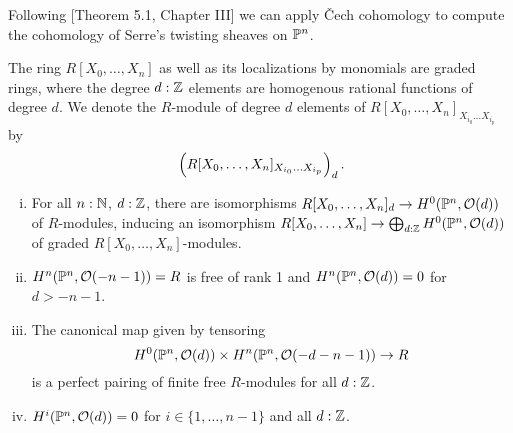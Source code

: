 
Following \cite{Hartshorne}[Theorem 5.1, Chapter III] we can apply \v{C}ech cohomology to compute
the cohomology of Serre's twisting sheaves on $\mathbb{P}^n$.

\begin{definition}
  The ring $R[X_0,\dots,X_n]$ as well as its localizations by monomials are graded rings,
  where the degree $d:\mathbb{Z}$ elements are homogenous rational functions of degree $d$.
  We denote the $R$-module of degree $d$ elements of $R[X_0,\dots,X_n]_{X_{i_0}\dots X_{i_p}}$ by
  \[
    \left(R[X_0,\dots,X_n]_{X_{i_0}\dots X_{i_p}}\right)_d
    \rlap{.}
  \]
\end{definition}

\begin{theorem}
  \begin{enumerate}[(i)]
  \item For all $n:\mathbb{N}$, $d:\mathbb{Z}$, there are isomorphisms $R[X_0,\dots,X_n]_d\to H^0(\mathbb{P}^n,\mathcal O(d))$ of $R$-modules, inducing an isomorphism $R[X_0,\dots,X_n]\to \bigoplus_{d:\mathbb{Z}} H^0(\mathbb{P}^n,\mathcal O(d))$ of graded $R[X_0,\dots,X_n]$-modules.
  \item $H^n(\mathbb{P}^n,\mathcal O(-n-1))=R$ is free of rank 1 and $H^n(\mathbb{P}^n,\mathcal O(d))=0$ for $d>-n-1$.
  \item The canonical map given by tensoring
    \[
      H^0(\mathbb{P}^n,\mathcal O(d)) \times H^n(\mathbb{P}^n,\mathcal O(-d-n-1))\to R
    \]
    is a perfect pairing of finite free $R$-modules for all $d:\mathbb{Z}$.
  \item $H^i(\mathbb{P}^n,\mathcal O(d))=0$ for $i\in\{1,\dots,n-1\}$ and all $d:\mathbb{Z}$.
  \end{enumerate}
\end{theorem}

